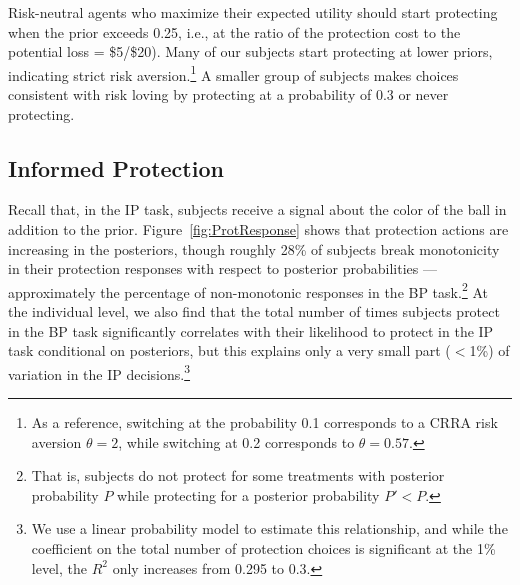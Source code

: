 \documentclass[12pt,a4paper]{article}
\begin{document}
Risk-neutral agents who maximize their expected utility should start protecting when the prior exceeds 0.25, i.e., at the ratio of the protection cost to the potential loss = \$5/\$20). Many of our subjects start protecting at lower priors, indicating strict risk aversion.\footnote{As a reference, switching at the probability 0.1 corresponds to a CRRA risk aversion $\theta=2$, while switching at 0.2 corresponds to $\theta=0.57$.}  A smaller group of subjects makes choices consistent with risk loving by protecting at a probability of 0.3 or never protecting. 

\subsection{Informed Protection}

Recall that, in the IP task, subjects receive a signal about the color of the ball in addition to the prior. 
Figure~\ref{fig:ProtResponse} shows that protection actions are increasing in the posteriors, though roughly 28\% of subjects break monotonicity in their protection responses with respect to posterior probabilities --- approximately the percentage of non-monotonic responses in the BP task.\footnote{That is, subjects do not protect for some treatments with posterior probability $P$ while protecting for a posterior probability $P'<P$.}  At the individual level, we also find that the total number of times subjects protect in the BP task significantly correlates with their likelihood to protect in the IP task conditional on posteriors, but this explains only a very small part ($<$1\%) of variation in the IP decisions.\footnote{We use a linear probability model to estimate this relationship, and while the coefficient on the total number of protection choices is significant at the 1\% level, the $R^2$ only increases from 0.295 to 0.3.} 


\end{document}

